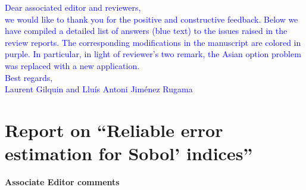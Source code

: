 \documentclass[10pt,a4paper]{article}
\begin{document}
\textcolor{blue}{Dear associated editor and reviewers,\\
we would like to thank you for the positive and constructive feedback. Below we have compiled a detailed list of answers (blue text) to the issues raised in the review reports. The corresponding modifications in the manuscript are colored in purple. In particular, in light of reviewer's two remark, the Asian option problem was replaced with a new application.\\
Best regards,\\
Laurent Gilquin and Llu\'{i}s Antoni Jim\'{e}nez Rugama}

\section*{Report on ``Reliable error estimation for Sobol' indices''}

\textbf{\large{Associate Editor comments}}
\vspace*{0.5cm}
\end{document}

